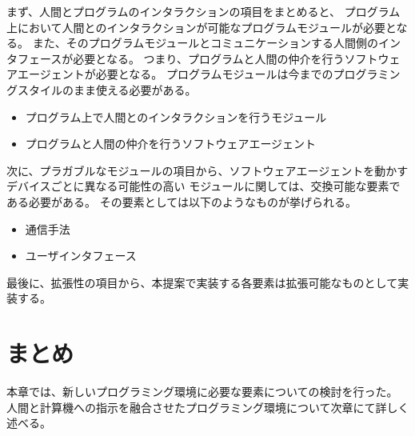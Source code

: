 まず、人間とプログラムのインタラクションの項目をまとめると、
プログラム上において人間とのインタラクションが可能なプログラムモジュールが必要となる。
また、そのプログラムモジュールとコミュニケーションする人間側のインタフェースが必要となる。
つまり、プログラムと人間の仲介を行うソフトウェアエージェントが必要となる。
プログラムモジュールは今までのプログラミングスタイルのまま使える必要がある。

\begin{itemize}
\itemsep1pt\parskip0pt
\item
  プログラム上で人間とのインタラクションを行うモジュール
\item
  プログラムと人間の仲介を行うソフトウェアエージェント
\end{itemize}

次に、プラガブルなモジュールの項目から、ソフトウェアエージェントを動かすデバイスごとに異なる可能性の高い
モジュールに関しては、交換可能な要素である必要がある。
その要素としては以下のようなものが挙げられる。

\begin{itemize}
\itemsep1pt\parskip0pt
\item
  通信手法
\item
  ユーザインタフェース
\end{itemize}

最後に、拡張性の項目から、本提案で実装する各要素は拡張可能なものとして実装する。

\section{まとめ}\label{ux307eux3068ux3081}

本章では、新しいプログラミング環境に必要な要素についての検討を行った。
人間と計算機への指示を融合させたプログラミング環境について次章にて詳しく述べる。
